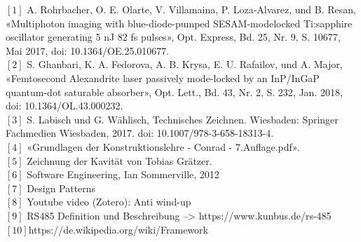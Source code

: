 $[1]$	A. Rohrbacher, O. E. Olarte, V. Villamaina, P. Loza-Alvarez, und B. Resan, «Multiphoton imaging with blue-diode-pumped SESAM-modelocked Ti:sapphire oscillator generating 5 nJ 82 fs pulses», Opt. Express, Bd. 25, Nr. 9, S. 10677, Mai 2017, doi: 10.1364/OE.25.010677.\\

$[2]$	S. Ghanbari, K. A. Fedorova, A. B. Krysa, E. U. Rafailov, und A. Major, «Femtosecond Alexandrite laser passively mode-locked by an InP/InGaP quantum-dot saturable absorber», Opt. Lett., Bd. 43, Nr. 2, S. 232, Jan. 2018, doi: 10.1364/OL.43.000232.\\

$[3]$    S. Labisch und G. Wählisch, Technisches Zeichnen. Wiesbaden: Springer Fachmedien Wiesbaden, 2017. doi: 10.1007/978-3-658-18313-4.\\

$[4]$   «Grundlagen der Konstruktionslehre - Conrad - 7.Auflage.pdf».\\

$[5]$    Zeichnung der Kavität von Tobias Grätzer.\\

$[6]$   Software Engineering, Ian Sommerville, 2012\\

$[7]$   Design Patterns\\

$[8]$   Youtube video (Zotero): Anti wind-up\\

$[9]$   RS485 Definition und Beschreibung --> https://www.kunbus.de/rs-485\\

$[10]$https://de.wikipedia.org/wiki/Framework\\